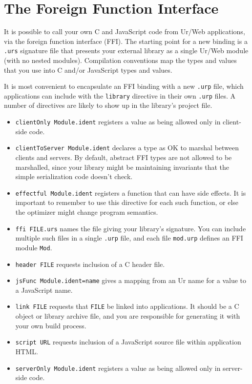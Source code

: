 \documentclass{article}
\begin{document}
\section{The Foreign Function Interface}

It is possible to call your own C and JavaScript code from Ur/Web applications, via the foreign function interface (FFI).  The starting point for a new binding is a \texttt{.urs} signature file that presents your external library as a single Ur/Web module (with no nested modules).  Compilation conventions map the types and values that you use into C and/or JavaScript types and values.

It is most convenient to encapsulate an FFI binding with a new \texttt{.urp} file, which applications can include with the \texttt{library} directive in their own \texttt{.urp} files.  A number of directives are likely to show up in the library's project file.

\begin{itemize}
\item \texttt{clientOnly Module.ident} registers a value as being allowed only in client-side code.
\item \texttt{clientToServer Module.ident} declares a type as OK to marshal between clients and servers.  By default, abstract FFI types are not allowed to be marshalled, since your library might be maintaining invariants that the simple serialization code doesn't check.
\item \texttt{effectful Module.ident} registers a function that can have side effects.  It is important to remember to use this directive for each such function, or else the optimizer might change program semantics.
\item \texttt{ffi FILE.urs} names the file giving your library's signature.  You can include multiple such files in a single \texttt{.urp} file, and each file \texttt{mod.urp} defines an FFI module \texttt{Mod}.
\item \texttt{header FILE} requests inclusion of a C header file.
\item \texttt{jsFunc Module.ident=name} gives a mapping from an Ur name for a value to a JavaScript name.
\item \texttt{link FILE} requests that \texttt{FILE} be linked into applications.  It should be a C object or library archive file, and you are responsible for generating it with your own build process.
\item \texttt{script URL} requests inclusion of a JavaScript source file within application HTML.
\item \texttt{serverOnly Module.ident} registers a value as being allowed only in server-side code.
\end{itemize}
\end{document}
